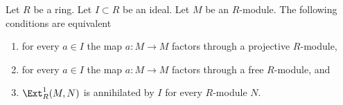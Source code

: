 \begin{lemma}
\label{lemma-near-projective}
Let $R$ be a ring. Let $I \subset R$ be an ideal. Let $M$ be an $R$-module.
The following conditions are equivalent
\begin{enumerate}
\item for every $a \in I$ the map $a : M \to M$ factors through a projective
$R$-module,
\item for every $a \in I$ the map $a : M \to M$ factors through a free
$R$-module, and
\item $\Ext^1_R(M, N)$ is annihilated by $I$ for every $R$-module $N$.
\end{enumerate}
\end{lemma}